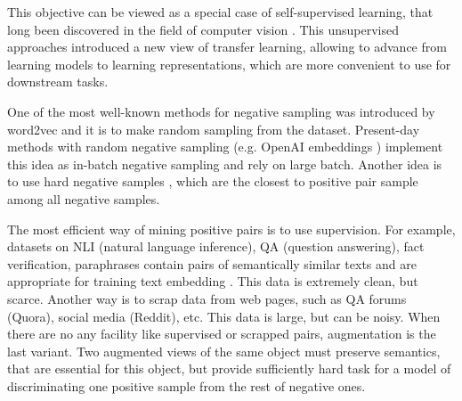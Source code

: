 \documentclass{article}
\begin{document}
This objective can be viewed as a special case of self-supervised learning, that long been discovered in the field of computer vision \cite{noroozi2017unsupervised, doersch2017multitask, wu2018unsupervised, oord2019representation}. This unsupervised approaches introduced a new view of transfer learning, allowing to advance from learning models to learning representations, which are more convenient to use for downstream tasks.


One of the most well-known methods for negative sampling was introduced by word2vec \cite{mikolov2013efficient} and it is to make random sampling from the dataset. Present-day methods with random negative sampling (e.g. OpenAI embeddings \cite{neelakantan2022text}) implement this idea as in-batch negative sampling and rely on large batch. Another idea is to use hard negative samples \cite{xiong2020approximate, feng2022languageagnostic}, which are the closest to positive pair sample among all negative samples. 


The most efficient way of mining positive pairs is to use supervision. For example, datasets on NLI (natural language inference), QA (question answering), fact verification, paraphrases contain pairs of semantically similar texts and are appropriate for training text embedding \cite{li2023general}. This data is extremely clean, but scarce. Another way is to scrap data from web pages, such as QA forums (Quora), social media (Reddit), etc. This data is large, but can be noisy. When there are no any facility like supervised or scrapped pairs, augmentation is the last variant. Two augmented views of the same object must preserve semantics, that are essential for this object, but provide sufficiently hard task for a model of discriminating one positive sample from the rest of negative ones. 
\end{document}
